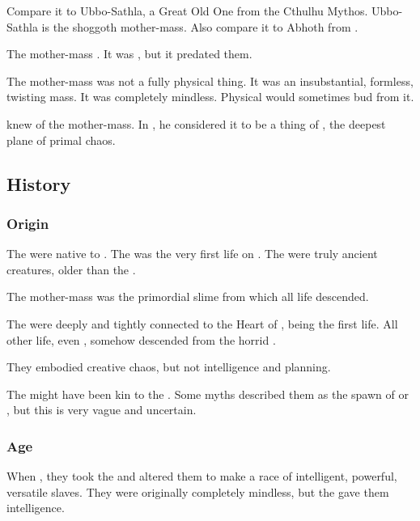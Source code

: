Compare it to Ubbo-Sathla, a Great Old One from the Cthulhu Mythos. 
Ubbo-Sathla is the shoggoth mother-mass.
Also compare it to Abhoth from \cite{ClarkAshtonSmith:TheSevenGeases}. 

The mother-mass . 
It was , but it predated them. 

The mother-mass was not a fully physical thing. 
It was an insubstantial, formless, twisting mass. 
It was completely mindless. 
Physical \noggyaleth would sometimes bud from it. 

 knew of the mother-mass.
In , he considered it to be a thing of \DaathKurZulNathla, the deepest plane of primal chaos. 









\subsection{History}





\subsubsection{Origin}
The \noggyaleth were native to \Miith.
The \noggyal {} was the very first life on \Miith. 
The \noggyaleth were truly ancient creatures, older than the \ophidians.

The mother-mass was the primordial slime from which all \Miithian{} life descended. 

The \noggyaleth were deeply and tightly connected to the Heart of \Miith, being the first life.
All other life, even \ophidians, somehow descended from the horrid \noggyaleth.

They embodied creative chaos, but not intelligence and planning.

The \noggyaleth might have been kin to the \xss.
Some \draconic myths described them as the spawn of \RuinSatha or \KyaethemChreiAz, but this is very vague and uncertain.





\subsubsection{\Voyager Age}
When , they took the \noggyaleth and altered them to make a race of intelligent, powerful, versatile slaves.
They were originally completely mindless, but the \voyagers gave them intelligence.

